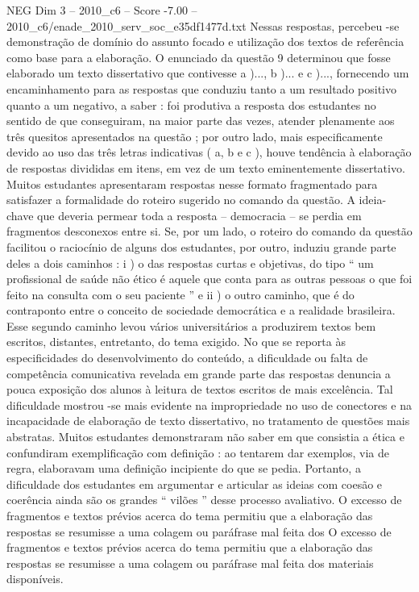 \begin{textsample}{NEG Dim 3 – 2010\_c6 – Score -7.00 – 2010\_c6/enade\_2010\_serv\_soc\_e35df1477d.txt}
Nessas respostas, percebeu -se demonstração de domínio do assunto focado e utilização dos textos de referência como base para a elaboração.
O enunciado da questão 9 determinou que fosse elaborado um texto dissertativo que contivesse a )..., b )... e c )..., fornecendo um encaminhamento para as respostas que conduziu tanto a um resultado positivo quanto a um negativo, a saber : foi produtiva a resposta dos estudantes no sentido de que conseguiram, na maior parte das vezes, atender plenamente aos três quesitos apresentados na questão ; por outro lado, mais especificamente devido ao uso das três letras indicativas ( a, b e c ), houve tendência à elaboração de respostas divididas em itens, em vez de um texto eminentemente dissertativo.
Muitos estudantes apresentaram respostas nesse formato fragmentado para satisfazer a formalidade do roteiro sugerido no comando da questão.
A ideia-chave que deveria permear toda a resposta – democracia – se perdia em fragmentos desconexos entre si.
Se, por um lado, o roteiro do comando da questão facilitou o raciocínio de alguns dos estudantes, por outro, induziu grande parte deles a dois caminhos : i ) o das respostas curtas e objetivas, do tipo “ um profissional de saúde não ético é aquele que conta para as outras pessoas o que foi feito na consulta com o seu paciente ” e ii ) o outro caminho, que é do contraponto entre o conceito de sociedade democrática e a realidade brasileira.
Esse segundo caminho levou vários universitários a produzirem textos bem escritos, distantes, entretanto, do tema exigido.
No que se reporta às especificidades do desenvolvimento do conteúdo, a dificuldade ou falta de competência comunicativa revelada em grande parte das respostas denuncia a pouca exposição dos alunos à leitura de textos escritos de mais excelência.
Tal dificuldade mostrou -se mais evidente na impropriedade no uso de conectores e na incapacidade de elaboração de texto dissertativo, no tratamento de questões mais abstratas.
Muitos estudantes demonstraram não saber em que consistia a ética e confundiram exemplificação com definição : ao tentarem dar exemplos, via de regra, elaboravam uma definição incipiente do que se pedia.
Portanto, a dificuldade dos estudantes em argumentar e articular as ideias com coesão e coerência ainda são os grandes “ vilões ” desse processo avaliativo.
O excesso de fragmentos e textos prévios acerca do tema permitiu que a elaboração das respostas se resumisse a uma colagem ou paráfrase mal feita dos O excesso de fragmentos e textos prévios acerca do tema permitiu que a elaboração das respostas se resumisse a uma colagem ou paráfrase mal feita dos materiais disponíveis.

\end{textsample}
